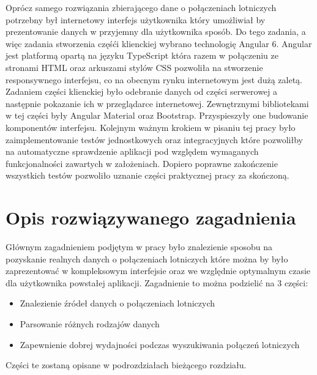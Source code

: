 \documentclass[a4paper, 12pt, twoside]{article}
\begin{document}
\newpage
Oprócz samego rozwiązania zbierającego dane o połączeniach lotniczych potrzebny był internetowy interfejs użytkownika który umożliwiał by prezentowanie danych w przyjemny dla użytkownika sposób. Do tego zadania, a więc zadania stworzenia częśći klienckiej wybrano technologię Angular 6. Angular jest platformą opartą na języku TypeScript która razem w połączeniu ze stronami HTML oraz arkuszami stylów CSS pozwoliła na stworzenie responsywnego interfejsu, co na obecnym rynku internetowym jest dużą zaletą. Zadaniem części klienckiej było odebranie danych od części serwerowej a następnie pokazanie ich w przeglądarce internetowej. Zewnętrznymi bibliotekami w tej części były Angular Material oraz Bootstrap. Przyspieszyły one budowanie komponentów interfejsu.
Kolejnym ważnym krokiem w pisaniu tej pracy było zaimplementowanie testów jednostkowych oraz integracyjnych które pozwoliłby na automatyczne sprawdzenie aplikacji pod względem wymaganych funkcjonalności zawartych w założeniach. Dopiero poprawne zakończenie wszystkich testów pozwoliło uznanie części praktycznej pracy za skończoną.

\newpage
\section{Opis rozwiązywanego zagadnienia}
Głównym zagadnieniem podjętym w pracy było znalezienie sposobu na pozyskanie realnych danych o połączeniach lotniczych które można by było zaprezentować w kompleksowym interfejsie oraz we względnie optymalnym czasie dla użytkownika powstałej aplikacji.
Zagadnienie to można podzielić na 3 części:
\begin{itemize}[noitemsep,topsep=0pt]
\item Znalezienie źródeł danych o połączeniach lotniczych
\item Parsowanie różnych rodzajów danych
\item Zapewnienie dobrej wydajności podczas wyszukiwania połączeń lotniczych
\end{itemize}
Części te zostaną opisane w podrozdziałach bieżącego rozdziału.
\end{document}

